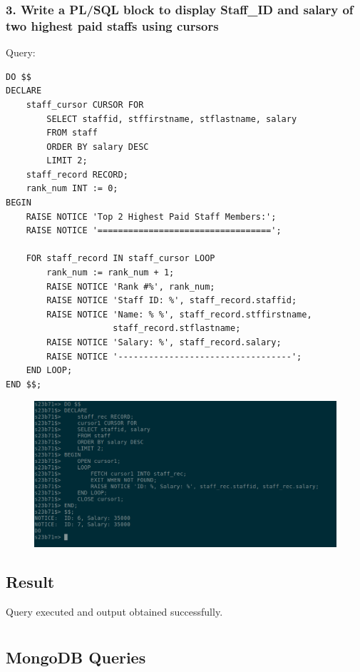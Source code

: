 \documentclass{article}
\begin{document}
\subsubsection*{3. Write a PL/SQL block to display Staff\_ID and salary of two highest paid staffs using cursors}
Query:
\begin{Verbatim}[frame=single,framerule=1pt,fontfamily=courier,fontsize=\small]
DO $$
DECLARE
    staff_cursor CURSOR FOR
        SELECT staffid, stffirstname, stflastname, salary
        FROM staff
        ORDER BY salary DESC
        LIMIT 2;
    staff_record RECORD;
    rank_num INT := 0;
BEGIN
    RAISE NOTICE 'Top 2 Highest Paid Staff Members:';
    RAISE NOTICE '==================================';
    
    FOR staff_record IN staff_cursor LOOP
        rank_num := rank_num + 1;
        RAISE NOTICE 'Rank #%', rank_num;
        RAISE NOTICE 'Staff ID: %', staff_record.staffid;
        RAISE NOTICE 'Name: % %', staff_record.stffirstname,
                     staff_record.stflastname;
        RAISE NOTICE 'Salary: %', staff_record.salary;
        RAISE NOTICE '----------------------------------';
    END LOOP;
END $$;
\end{Verbatim}
\begin{figure}[H]
    \centering
    \includegraphics[width=\textwidth]{cycle6/6-6.png}
\end{figure}

\subsection*{Result}
Query executed and output obtained successfully.

\newpage
\section*{}
\subsection*{MongoDB Queries}
\end{document}

